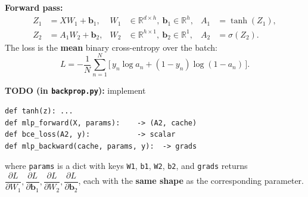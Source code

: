\documentclass{homework}
\begin{document}
\textbf{Forward pass:}
\begin{align*}
Z_1 &= X W_1 + \mathbf{b}_1, & W_1 &\in \mathbb{R}^{d\times h},\ \mathbf{b}_1\in\mathbb{R}^{h}, & A_1 &= \tanh(Z_1),\\
Z_2 &= A_1 W_2 + \mathbf{b}_2, & W_2 &\in \mathbb{R}^{h\times 1},\ \mathbf{b}_2\in\mathbb{R}^{1}, & A_2 &= \sigma(Z_2).
\end{align*}
The loss is the \textbf{mean} binary cross-entropy over the batch:
\[
L = -\frac{1}{N}\sum_{n=1}^{N}\Big[\,y_n \log a_n + (1-y_n)\log(1-a_n)\,\Big].
\]

\textbf{TODO (in \texttt{backprop.py}):} implement
\begin{verbatim}
def tanh(z): ...
def mlp_forward(X, params):    -> (A2, cache)
def bce_loss(A2, y):           -> scalar
def mlp_backward(cache, params, y):  -> grads
\end{verbatim}
where \texttt{params} is a dict with keys \texttt{W1}, \texttt{b1}, \texttt{W2}, \texttt{b2}, and \texttt{grads} returns $\dfrac{\partial L}{\partial W_1},\dfrac{\partial L}{\partial \mathbf{b}_1},\dfrac{\partial L}{\partial W_2},\dfrac{\partial L}{\partial \mathbf{b}_2}$, each with the \textbf{same shape} as the corresponding parameter.
\end{document}
